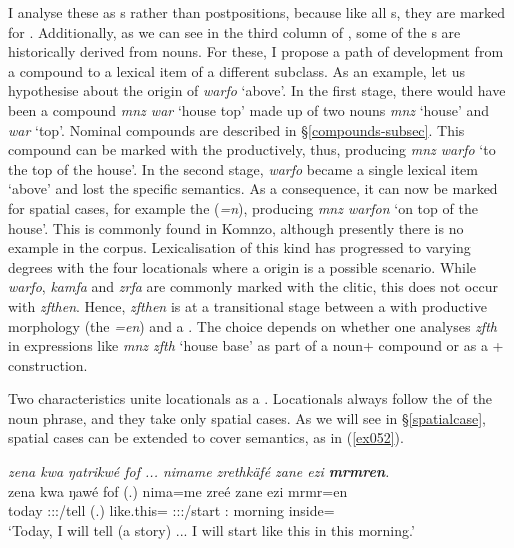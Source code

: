 I analyse these as  s rather than postpositions, because like all s, they are marked for . Additionally, as we can see in the third column of , some of the  s are historically derived from nouns. For these, I propose a path of development from a  compound to a lexical item of a different  subclass. As an example, let us hypothesise about the origin of \emph{warfo} `above'. In the first stage, there would have been a  compound \emph{mnz war} `house top' made up of two nouns \emph{mnz} `house' and \emph{war} `top'. Nominal compounds are described in {\S}\ref{compounds-subsec}. This compound can be marked with the   productively, thus, producing \emph{mnz warfo} `to the top of the house'. In the second stage, \emph{warfo} became a single lexical item `above' and lost the specific  semantics. As a consequence, it can now be marked for spatial cases, for example the   (\emph{=n}), producing \emph{mnz warfon} `on top of the house'. This is commonly found in Komnzo, although presently there is no example in the corpus. Lexicalisation of this kind has progressed to varying degrees with the four locationals where a  origin is a possible scenario. While \emph{warfo}, \emph{kamfa} and \emph{zrfa} are commonly marked with the   clitic, this does not occur with \emph{zfthen}. Hence, \emph{zfthen} is at a transitional stage between a  with productive morphology (the   \emph{=en}) and a . The choice depends on whether one analyses \emph{zfth} in expressions like \emph{mnz zfth} `house base' as part of a noun+ compound or as a + construction.

\largerpage
Two characteristics unite locationals as a . Locationals always follow the  of the noun phrase, and they take only spatial cases. As we will see in {\S}\ref{spatialcase}, spatial cases can be extended to cover  semantics, as in (\ref{ex052}).

  
\begin{exe}
	\ex \emph{zena kwa ŋatrikwé fof ... nimame zrethkäfé zane ezi \textbf{mrmren}.}\\
	\gll zena kwa ŋawé fof (.) nima=me zreé zane ezi mrmr=en\\
	today {\Fut} \Fsg:\Sbj:\Nonpast:\Ipfv/tell {\Emph} (.) {like.this}={\Ins} \Fsg:\Sbj:\Irr:\Pfv/start \Dem:{\Prox} morning inside={\Loc}\\
	\trans `Today, I will tell (a story) ... I will start like this in this morning.'\\ 
	\label{ex052}
\end{exe}

